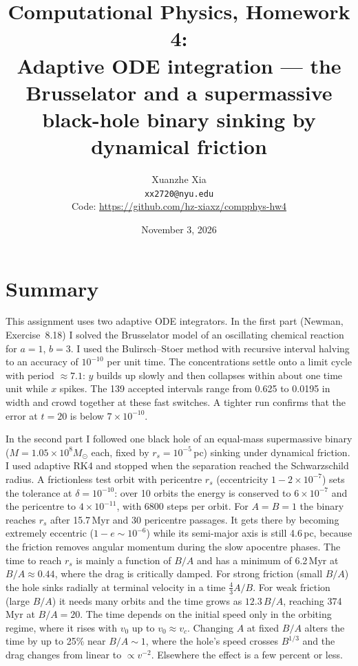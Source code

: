 \documentclass[11pt]{article}
\title{Computational Physics, Homework 4:\\
Adaptive ODE integration --- the Brusselator and a supermassive black-hole
binary sinking by dynamical friction}
\author{Xuanzhe Xia \\ \texttt{xx2720@nyu.edu} \\[4pt]
\small Code: \url{https://github.com/hz-xiaxz/compphys-hw4}}
\date{November 3, 2026}
\newcommand{\sci}[2]{$#1\times10^{#2}$}
\newcommand{\rs}{r_s}
\begin{document}
\maketitle

\section*{Summary}

This assignment uses two adaptive ODE integrators. In the first part
(Newman, Exercise~8.18) I solved the Brusselator model of an oscillating
chemical reaction for $a=1$, $b=3$. I used the Bulirsch--Stoer method with
recursive interval halving to an accuracy of $10^{-10}$ per unit time. The
concentrations settle onto a limit cycle with period $\approx7.1$: $y$ builds
up slowly and then collapses within about one time unit while $x$ spikes. The
139 accepted intervals range from 0.625 to 0.0195 in width and crowd together
at these fast switches. A tighter run confirms that the error at $t=20$ is
below \sci{7}{-10}.

In the second part I followed one black hole of an equal-mass
supermassive binary ($M=1.05\times10^8M_\odot$ each, fixed by
$\rs=10^{-5}$\,pc) sinking under dynamical friction. I used adaptive RK4 and
stopped when the separation reached the Schwarzschild radius. A
frictionless test orbit with pericentre $\rs$ (eccentricity
$1-2\times10^{-7}$) sets the tolerance at $\delta=10^{-10}$: over 10 orbits
the energy is conserved to \sci{6}{-7} and the pericentre to \sci{4}{-11},
with 6800 steps per orbit. For $A=B=1$ the binary reaches $\rs$ after
15.7\,Myr and 30 pericentre passages. It gets there by becoming extremely
eccentric ($1-e\sim10^{-6}$) while its semi-major axis is still 4.6\,pc,
because the friction removes angular momentum during the slow apocentre
phases. The time to reach $\rs$ is mainly a function of $B/A$ and has a
minimum of 6.2\,Myr at $B/A\approx0.44$, where the drag is critically damped.
For strong friction (small $B/A$) the hole sinks radially at terminal velocity
in a time $\frac43A/B$. For weak friction (large $B/A$) it needs many orbits
and the time grows as $12.3\,B/A$, reaching 374\,Myr at $B/A=20$. The time
depends on the initial speed only in the orbiting regime, where it rises with
$v_0$ up to $v_0\approx v_c$. Changing $A$ at fixed $B/A$ alters the time by
up to 25\% near $B/A\sim1$, where the hole's speed crosses $B^{1/3}$ and the
drag changes from linear to $\propto v^{-2}$. Elsewhere the effect is a few
percent or less.
\end{document}

